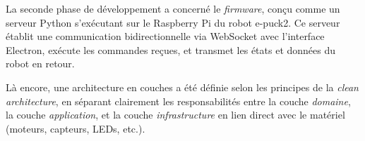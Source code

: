 La seconde phase de développement a concerné le \textit{firmware}, conçu comme un serveur Python s’exécutant sur le Raspberry Pi du robot e-puck2. 
Ce serveur établit une communication bidirectionnelle via WebSocket avec l’interface Electron, exécute les commandes reçues, et transmet les états et données du robot en retour.

Là encore, une architecture en couches a été définie selon les principes de la \textit{clean architecture}, en séparant clairement les responsabilités entre la couche \textit{domaine}, la couche \textit{application}, et la couche \textit{infrastructure} en lien direct avec le matériel (moteurs, capteurs, LEDs, etc.).
